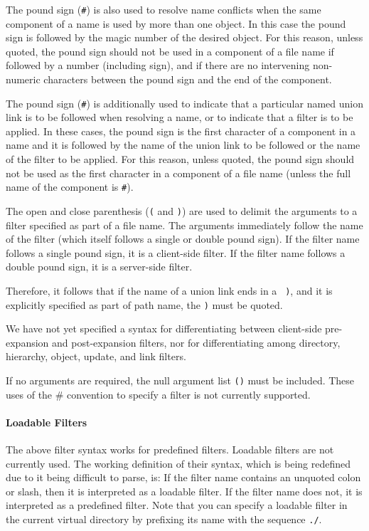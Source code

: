The pound sign ({\tt \#}) is also used to resolve name conflicts when
the same component of a name is used by more than one object.  In this
case the pound sign is followed by the magic number of the desired
object.  For this reason, unless quoted, the pound sign should not be
used in a component of a file name if followed by a number (including
sign), and if there are no intervening non-numeric characters between
the pound sign and the end of the component.

The pound sign ({\tt \#}) is additionally used to indicate that a
particular named union link is to be followed when resolving a name,
or to indicate that a filter is to be applied.  In these cases, the
pound sign is the first character of a component in a name and it is
followed by the name of the union link to be followed or the name of
the filter to be applied.  For this reason, unless quoted, the pound
sign should not be used as the first character in a component of a
file name (unless the full name of the component is {\tt \#}).  

The open and close parenthesis ({\tt (} and {\tt )}) are used to
delimit the arguments to a filter specified as part of a file name.
The arguments immediately follow the name of the filter (which itself
follows a single or double pound sign).  If the filter name follows a
single pound sign, it is a client-side filter.  If the filter name
follows a double pound sign, it is a server-side filter.  

Therefore, it follows that if the name of a union link ends in a {\tt
)}, and it is explicitly specified as part of path name, the {\tt )}
must be quoted.

We have not yet specified a syntax for
differentiating between client-side pre-expansion and post-expansion
filters, nor for differentiating among directory, hierarchy, object,
update, and link filters.


If no arguments are required, the null argument list {\tt ()} must be
included.  These uses of the \# convention to specify a filter is not
currently supported.

\paragraph{Loadable Filters}

The above filter syntax works for predefined filters.  Loadable
filters are not currently used.  The working definition of their
syntax, which is being redefined due to it being difficult to parse,
is: If the filter name contains an unquoted colon or slash, then it is
interpreted as a loadable filter.  If the filter name does not, it is
interpreted as a predefined filter.  Note that you can specify a
loadable filter in the current virtual directory by prefixing its name
with the sequence {\tt ./}.


